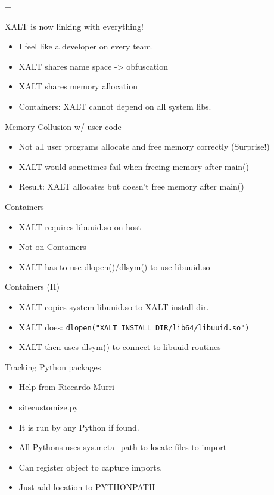 +\documentclass{beamer}
\begin{document}
\begin{frame}{XALT is now linking with everything!}
  \begin{itemize}
    \item I feel like a developer on every team.
    \item XALT shares name space -> obfuscation
    \item XALT shares memory allocation
    \item Containers: XALT cannot depend on all system libs.
  \end{itemize}
\end{frame}

\begin{frame}{Memory Collusion w/ user code }
  \begin{itemize}
    \item Not all user programs allocate and free memory correctly (Surprise!)
    \item XALT would sometimes fail when freeing memory after main()
    \item Result: XALT allocates but doesn't free memory after main()
  \end{itemize}
\end{frame}

\begin{frame}{Containers}
  \begin{itemize}
    \item XALT requires libuuid.so on host
    \item Not on Containers
    \item XALT has to use dlopen()/dlsym() to use libuuid.so
  \end{itemize}
\end{frame}

\begin{frame}{Containers (II)}
  \begin{itemize}
    \item XALT copies system libuuid.so to XALT install dir.
    \item XALT does: \texttt{dlopen("XALT\_INSTALL\_DIR/lib64/libuuid.so")}
    \item XALT then uses dlsym() to connect to libuuid routines
  \end{itemize}
\end{frame}

\begin{frame}{Tracking Python packages}
  \begin{itemize}
    \item Help from Riccardo Murri
    \item sitecustomize.py
    \item It is run by any Python if found.
    \item All Pythons uses sys.meta\_path to locate files to import
    \item Can register object to capture imports.
    \item Just add location to PYTHONPATH
  \end{itemize}
\end{frame}
\end{document}
